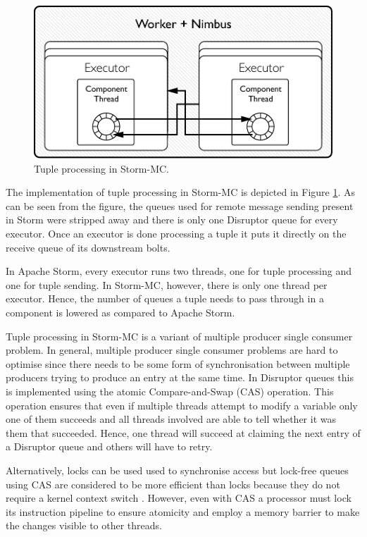 \documentclass[bsc,logo,frontabs,twoside,singlespacing,normalheadings,parskip]{infthesis}\usepackage[]{graphicx}\usepackage[]{color}
\begin{document}
\begin{figure}[!htb]
	\centering
	\includegraphics[scale=0.7]{pdf/worker_inside_mc.pdf}
	\caption{Tuple processing in Storm-MC.}
	\label{fig:worker_inside_mc}
\end{figure}

The implementation of tuple processing in Storm-MC is depicted in Figure \ref{fig:worker_inside_mc}. As can be seen from the figure, the queues used for remote message sending present in Storm were stripped away and there is only one Disruptor queue for every executor. Once an executor is done processing a tuple it puts it directly on the receive queue of its downstream bolts.

In Apache Storm, every executor runs two threads, one for tuple processing and one for tuple sending. In Storm-MC, however, there is only one thread per executor. Hence, the number of queues a tuple needs to pass through in a component is lowered as compared to Apache Storm.

Tuple processing in Storm-MC is a variant of multiple producer single consumer problem. In general, multiple producer single consumer problems are hard to optimise since there needs to be some form of synchronisation between multiple producers trying to produce an entry at the same time. In Disruptor queues this is implemented using the atomic Compare-and-Swap (CAS) operation. This operation ensures that even if multiple threads attempt to modify a variable only one of them succeeds and all threads involved are able to tell whether it was them that succeeded. Hence, one thread will succeed at claiming the next entry of a Disruptor queue and others will have to retry.

Alternatively, locks can be used used to synchronise access but lock-free queues using CAS are considered to be more efficient than locks because they do not require a kernel context switch \cite{Thompson_Farley_Barker_Gee_Stewart_2011}. However, even with CAS a processor must lock its instruction pipeline to ensure atomicity and employ a memory barrier to make the changes visible to other threads.
\end{document}
